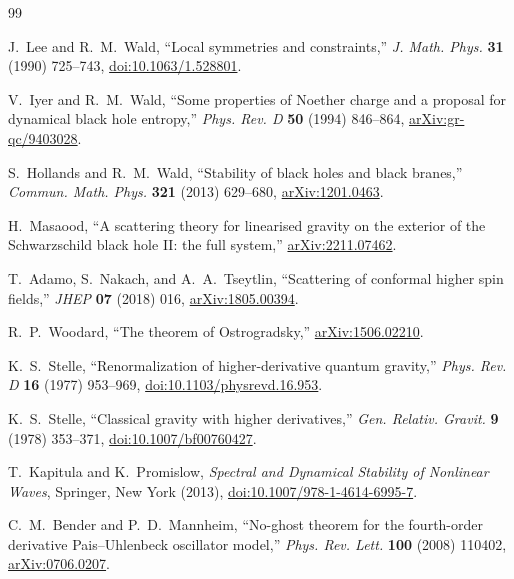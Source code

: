 \documentclass[11pt]{article}
\begin{document}
\begin{thebibliography}{99}

J.~Lee and R.~M.~Wald,
``Local symmetries and constraints,''
\emph{J. Math. Phys.} \textbf{31} (1990) 725--743,
\href{https://doi.org/10.1063/1.528801}{doi:10.1063/1.528801}.

V.~Iyer and R.~M.~Wald,
``Some properties of Noether charge and a proposal for dynamical black hole
entropy,'' \emph{Phys. Rev. D} \textbf{50} (1994) 846--864,
\href{https://arxiv.org/abs/gr-qc/9403028}{arXiv:gr-qc/9403028}.

S.~Hollands and R.~M.~Wald,
``Stability of black holes and black branes,''
\emph{Commun. Math. Phys.} \textbf{321} (2013) 629--680,
\href{https://arxiv.org/abs/1201.0463}{arXiv:1201.0463}.

H.~Masaood,
``A scattering theory for linearised gravity on the exterior of the
Schwarzschild black hole II: the full system,''
\href{https://arxiv.org/abs/2211.07462}{arXiv:2211.07462}.

T.~Adamo, S.~Nakach, and A.~A.~Tseytlin,
``Scattering of conformal higher spin fields,''
\emph{JHEP} \textbf{07} (2018) 016,
\href{https://arxiv.org/abs/1805.00394}{arXiv:1805.00394}.

R.~P.~Woodard,
``The theorem of Ostrogradsky,''
\href{https://arxiv.org/abs/1506.02210}{arXiv:1506.02210}.

K.~S.~Stelle,
``Renormalization of higher-derivative quantum gravity,''
\emph{Phys. Rev. D} \textbf{16} (1977) 953--969,
\href{https://doi.org/10.1103/physrevd.16.953}{doi:10.1103/physrevd.16.953}.

K.~S.~Stelle,
``Classical gravity with higher derivatives,''
\emph{Gen. Relativ. Gravit.} \textbf{9} (1978) 353--371,
\href{https://doi.org/10.1007/bf00760427}{doi:10.1007/bf00760427}.

T.~Kapitula and K.~Promislow,
\emph{Spectral and Dynamical Stability of Nonlinear Waves},
Springer, New York (2013),
\href{https://doi.org/10.1007/978-1-4614-6995-7}{doi:10.1007/978-1-4614-6995-7}.

C.~M.~Bender and P.~D.~Mannheim,
``No-ghost theorem for the fourth-order derivative Pais--Uhlenbeck oscillator
model,'' \emph{Phys. Rev. Lett.} \textbf{100} (2008) 110402,
\href{https://arxiv.org/abs/0706.0207}{arXiv:0706.0207}.


\end{thebibliography}
\end{document}
